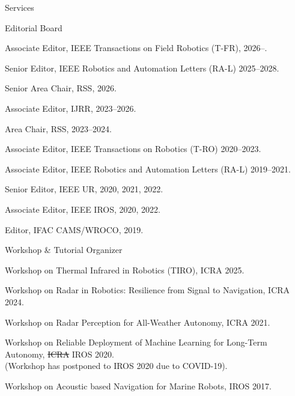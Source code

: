 \begin{rSection}{Services}
%
%

\begin{rSubsection}{Editorial Board}{}{}{}
  \item Associate Editor, IEEE Transactions on Field Robotics (T-FR), 2026--.
  \item Senior Editor, IEEE Robotics and Automation Letters (RA-L) 2025--2028.
  \item Senior Area Chair, RSS, 2026.
  \item Associate Editor, IJRR, 2023--2026.
  \item Area Chair, RSS, 2023--2024.
  \item Associate Editor, IEEE Transactions on Robotics (T-RO) 2020--2023.
  \item Associate Editor, IEEE Robotics and Automation Letters (RA-L) 2019--2021.
  \item Senior Editor, IEEE UR, 2020, 2021, 2022.
  \item Associate Editor, IEEE IROS, 2020, 2022.
  \item Editor, IFAC CAMS/WROCO, 2019.
\end{rSubsection}

\begin{rSubsection}{Workshop \& Tutorial Organizer}{}{}{}
  \item Workshop on Thermal Infrared in Robotics (TIRO), ICRA 2025.
  \item Workshop on Radar in Robotics: Resilience from Signal to Navigation, ICRA 2024.
  \item Workshop on Radar Perception for All-Weather Autonomy, ICRA 2021.
  \item Workshop on Reliable Deployment of Machine Learning for Long-Term Autonomy, \sout{ICRA} IROS 2020.\\
  (Workshop has postponed to IROS 2020 due to COVID-19).
  \item Workshop on Acoustic based Navigation for Marine Robots, IROS 2017.
\end{rSubsection}


\end{rSection}
